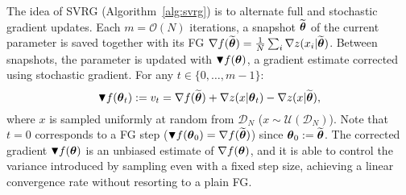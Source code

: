 The idea of \acs{SVRG} (Algorithm~\ref{alg:svrg}) is to alternate full and stochastic gradient updates. 
Each $m = \mathcal{O}(N)$ iterations, a snapshot $\widetilde{\boldsymbol{\theta}}$ of the current parameter is saved together with its \acs{FG} $\nabla f(\widetilde{\boldsymbol{\theta}}) = \frac{1}{N} \sum_i \nabla z(x_i|\widetilde{\boldsymbol{\theta}})$.
Between snapshots, the parameter is updated with $\blacktriangledown f(\boldsymbol{\theta})$, a gradient estimate corrected using stochastic gradient. For any $t \in \{0,\ldots,m-1\}$:
\begin{equation}\label{E:svrg.gradient.correction}
        \blacktriangledown f(\boldsymbol{\theta}_{t}) := v_t = \nabla f(\widetilde{\boldsymbol{\theta}}) + \nabla z(x | \boldsymbol{\theta}_t) - \nabla z(x | \widetilde{\boldsymbol{\theta}}),
\end{equation} 
where $x$ is sampled uniformly at random from $\mathcal{D}_N$ (\ie $x \sim \mathcal{U}(\mathcal{D}_N)$).
Note that $t=0$ corresponds to a \acs{FG} step (\ie $\blacktriangledown f(\boldsymbol{\theta}_0) = \nabla f(\widetilde{\boldsymbol{\theta}})$) since $\boldsymbol{\theta}_0 := \widetilde{\boldsymbol{\theta}}$.
The corrected gradient $\blacktriangledown f(\boldsymbol{\theta})$ is an unbiased estimate of $\nabla f(\boldsymbol{\theta})$, and it is able to control the variance introduced by sampling even with a fixed step size, achieving a linear convergence rate without resorting to a plain \acs{FG}.


